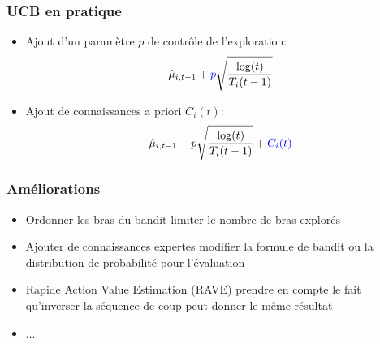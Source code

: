 \documentclass[compress, color = usenames, dvipsnames]{beamer}
\begin{document}
\begin{frame}
    \frametitle{UCB en pratique}
    \begin{itemize}
        \item Ajout d'un paramètre $p$ de contrôle de l'exploration:
            $$ \hat{\mu}_{i,t-1} + {\color{blue}p} \sqrt{\frac{\log(t)}{T_i(t-1)}} $$
        \item Ajout de connaissances a priori $C_i(t)$:
            $$ \hat{\mu}_{i,t-1} + p \sqrt{\frac{\log(t)}{T_i(t-1)}} + {\color{blue} C_i(t)} $$
    \end{itemize}
    
\end{frame}

\begin{frame}
    \frametitle{Améliorations}
    \begin{itemize}
        \item Ordonner les bras du bandit
        \itemSo limiter le nombre de bras explorés
        \item Ajouter de connaissances expertes \cite{chaslot2009adding}
        \itemSo modifier la formule de bandit ou la distribution de probabilité pour l'évaluation
        \item Rapide Action Value Estimation (RAVE) \cite{gelly2007combining}
        \itemSo prendre en compte le fait qu'inverser la séquence de coup peut donner le même résultat
        \item ...
    \end{itemize}
    
\end{frame}
\end{document}
